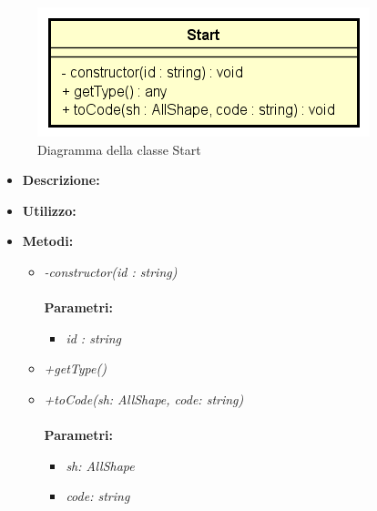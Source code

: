 \begin{figure}[h!]
	\centering
	\includegraphics[scale=0.8]{res/sections/SpecificaFrontEnd/Services/Disegnetti/start.png}
	\caption{Diagramma della classe Start}
\end{figure}

\begin{itemize}
	\item \textbf{Descrizione:}\\
	
	\item \textbf{Utilizzo:}\\
	
	\item \textbf{Metodi:}
		\begin{itemize}
			\item \emph{-constructor(id : string)}\\
    		\\
    		\textbf{Parametri:}
    		\begin{itemize}
    			\item \emph{id : string}\\
    			
    		\end{itemize}
    		\item \emph{+getType()}\\
    		
    		\item \emph{+toCode(sh: AllShape, code: string)}\\
    		\\
    		\textbf{Parametri:}
    		\begin{itemize}
    			\item \emph{sh: AllShape}\\
    			
    			\item \emph{code: string}\\
    			
    		\end{itemize}
    	\end{itemize}
\end{itemize}
